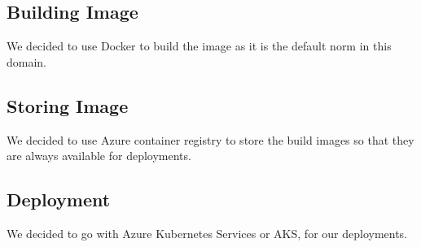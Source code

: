 \subsection{Building Image}
We decided to use Docker to build the image as it is the default norm in this domain.

\subsection{Storing Image}
We decided to use Azure container registry to store the build images so that they are always available for deployments.

\subsection{Deployment}
We decided to go with Azure Kubernetes Services or AKS, for our deployments.
